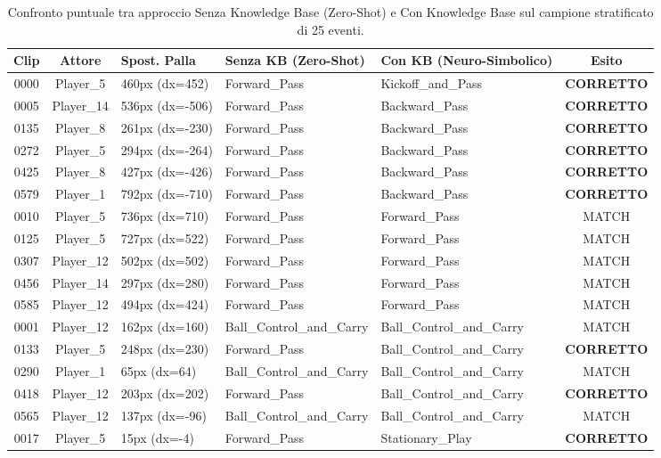 \begin{table}[htbp]
\centering
\small
\caption{Confronto puntuale tra approccio Senza Knowledge Base (Zero-Shot) e Con Knowledge Base sul campione stratificato di 25 eventi.}
\label{tab:stratified_benchmark_25}
\begin{tabular}{cclllc}
\hline
\textbf{Clip} & \textbf{Attore} & \textbf{Spost. Palla} & \textbf{Senza KB (Zero-Shot)} & \textbf{Con KB (Neuro-Simbolico)} & \textbf{Esito} \\
\hline
0000 & Player_5 & 460px (dx=452) & Forward\_Pass & Kickoff\_and\_Pass & \textbf{CORRETTO} \\
0005 & Player_14 & 536px (dx=-506) & Forward\_Pass & Backward\_Pass & \textbf{CORRETTO} \\
0135 & Player_8 & 261px (dx=-230) & Forward\_Pass & Backward\_Pass & \textbf{CORRETTO} \\
0272 & Player_5 & 294px (dx=-264) & Forward\_Pass & Backward\_Pass & \textbf{CORRETTO} \\
0425 & Player_8 & 427px (dx=-426) & Forward\_Pass & Backward\_Pass & \textbf{CORRETTO} \\
0579 & Player_1 & 792px (dx=-710) & Forward\_Pass & Backward\_Pass & \textbf{CORRETTO} \\
0010 & Player_5 & 736px (dx=710) & Forward\_Pass & Forward\_Pass & MATCH \\
0125 & Player_5 & 727px (dx=522) & Forward\_Pass & Forward\_Pass & MATCH \\
0307 & Player_12 & 502px (dx=502) & Forward\_Pass & Forward\_Pass & MATCH \\
0456 & Player_14 & 297px (dx=280) & Forward\_Pass & Forward\_Pass & MATCH \\
0585 & Player_12 & 494px (dx=424) & Forward\_Pass & Forward\_Pass & MATCH \\
0001 & Player_12 & 162px (dx=160) & Ball\_Control\_and\_Carry & Ball\_Control\_and\_Carry & MATCH \\
0133 & Player_5 & 248px (dx=230) & Forward\_Pass & Ball\_Control\_and\_Carry & \textbf{CORRETTO} \\
0290 & Player_1 & 65px (dx=64) & Ball\_Control\_and\_Carry & Ball\_Control\_and\_Carry & MATCH \\
0418 & Player_12 & 203px (dx=202) & Forward\_Pass & Ball\_Control\_and\_Carry & \textbf{CORRETTO} \\
0565 & Player_12 & 137px (dx=-96) & Ball\_Control\_and\_Carry & Ball\_Control\_and\_Carry & MATCH \\
0017 & Player_5 & 15px (dx=-4) & Forward\_Pass & Stationary\_Play & \textbf{CORRETTO} \\

\end{tabular}
\end{table}
